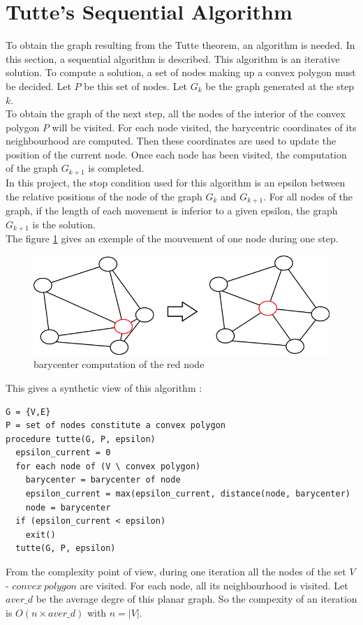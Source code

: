 \section{Tutte's Sequential Algorithm}

To obtain the graph resulting from the Tutte theorem, an algorithm is
needed. In this section, a sequential algorithm is described. This
algorithm is an iterative solution. To compute a solution, a set of nodes
 making up a convex polygon must be decided. Let $P$ be this set of nodes. Let
$G_k$ be the graph generated at the step $k$.
\\

To obtain the graph of the next step, all the nodes of the interior of the
convex polygon $P$ will be visited. For each node visited, the barycentric
coordinates of its neighbourhood are computed. Then these coordinates are used
to update the position of the current node. Once each node has been visited,
the computation of the graph $G_{k+1}$ is completed.
\\
In this project, the stop condition used for this algorithm is an epsilon
between the relative positions of the node of the graph $G_k$ and
$G_{k+1}$. For all nodes of the graph, if the length of each movement is
inferior to a given epsilon, the graph $G_{k+1}$ is the solution.
\\

The figure \ref{transition} gives an exemple of the mouvement of one node
during one step.
\begin{figure}[!h]
\centering
\includegraphics[scale=0.5]{img/transition.png}
\caption{barycenter computation of the red node}
\label{transition}
\end{figure}

This gives a synthetic view of this algorithm : 
\begin{verbatim}
G = {V,E}
P = set of nodes constitute a convex polygon
procedure tutte(G, P, epsilon)
  epsilon_current = 0
  for each node of (V \ convex polygon)
    barycenter = barycenter of node
    epsilon_current = max(epsilon_current, distance(node, barycenter)
    node = barycenter
  if (epsilon_current < epsilon)
    exit()
  tutte(G, P, epsilon)
\end{verbatim}

From the complexity point of view, during one iteration all the nodes of
the set $V$ - $convex~polygon$ are visited. For each node, all its
neighbourhood is visited. Let $aver\_d$ be the average degre of this planar
graph. So the compexity of an iteration is $\mathit{O(n \times aver\_d)}$
with $n = |V|$.

